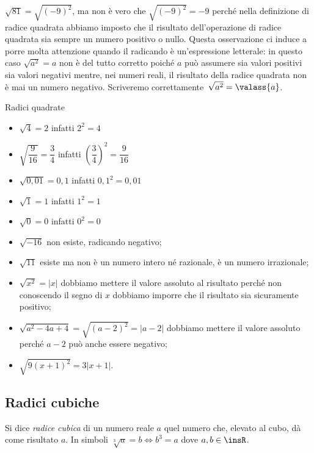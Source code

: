 \osservazione \(\sqrt{81}=\sqrt{(-9)^2}\), ma non è vero che 
\(\sqrt{(-9)^2}=-9\) perché nella definizione di radice quadrata abbiamo imposto 
che il risultato dell'operazione di radice quadrata sia sempre un numero 
positivo o nullo.
Questa osservazione ci induce a porre molta attenzione quando il radicando è 
un'espressione letterale: in questo caso \(\sqrt{a^2}=a\) non è del tutto 
corretto poiché \(a\) può assumere sia valori positivi sia valori negativi
mentre, nei numeri reali, il risultato della radice quadrata non è mai un 
numero negativo. 
Scriveremo correttamente~\(\sqrt{a^2}=\valass{a}\).

\begin{exrig}
\begin{esempio}
Radici quadrate
 \begin{multicols}{2}
\begin{itemize}
\item \(\sqrt 4=2\) infatti \(2^2=4\)
\item \(\sqrt{\dfrac 9{16}}=\dfrac 3 4\) infatti \(\left(\dfrac 3 4\right)^2=
  \dfrac 9{16}\)
\item \(\sqrt{0,01}=0,1\) infatti \(0,1^2=0,01\)
\item \(\sqrt 1=1\) infatti \(1^2=1\)
\item \(\sqrt 0=0\) infatti \(0^2=0\)
\item \(\sqrt{-16}\) non esiste, radicando negativo;
\item \(\sqrt{11}\) esiste ma non è un numero intero né razionale, 
  è un numero irrazionale;
\item \(\sqrt{x^2}=\left|x\right|\) dobbiamo mettere il valore assoluto 
  al risultato perché non conoscendo il segno di \(x\) dobbiamo imporre che 
  il risultato sia sicuramente positivo;
\item \(\sqrt{a^2-4a+4}=\sqrt{(a-2)^2}=\left|a-2\right|\) dobbiamo mettere 
  il valore assoluto perché \(a-2\) può anche essere negativo;
\item \(\sqrt{9(x+1)^2}=3\left|x+1\right|\).
\end{itemize}
\end{multicols}
\end{esempio}
\end{exrig}

\subsection{Radici cubiche}

\begin{definizione}
 Si dice \emph{radice cubica} di un numero reale \(a\) quel numero che, 
 elevato al cubo, dà come risultato \(a\). 
 In simboli \(\sqrt[3]a=b \Leftrightarrow b^3=a\) dove \(a,b\in \insR\).
\end{definizione}


